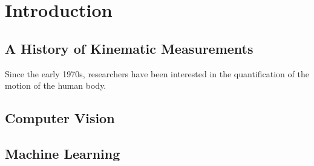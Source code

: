 \chapter{Introduction}

\section{A History of Kinematic Measurements}

Since the early 1970s, researchers have been interested in the quantification of the motion of the human body.



\section{Computer Vision}


\section{Machine Learning}



